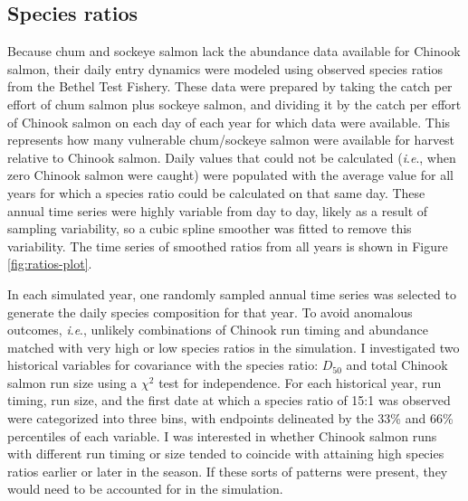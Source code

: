 \documentclass[12pt,]{book}
\theoremstyle{definition}
\theoremstyle{definition}
\theoremstyle{definition}
\theoremstyle{remark}
\begin{document}
\subsection{Species ratios}\label{mse-data-ratios}

\noindent
Because chum and sockeye salmon lack the abundance data available for
Chinook salmon, their daily entry dynamics were modeled using observed
species ratios from the Bethel Test Fishery. These data were prepared by
taking the catch per effort of chum salmon plus sockeye salmon, and
dividing it by the catch per effort of Chinook salmon on each day of
each year for which data were available. This represents how many
vulnerable chum/sockeye salmon were available for harvest relative to
Chinook salmon. Daily values that could not be calculated
(\emph{i}.\emph{e}., when zero Chinook salmon were caught) were
populated with the average value for all years for which a species ratio
could be calculated on that same day. These annual time series were
highly variable from day to day, likely as a result of sampling
variability, so a cubic spline smoother was fitted to remove this
variability. The time series of smoothed ratios from all years is shown
in Figure \ref{fig:ratios-plot}.

In each simulated year, one randomly sampled annual time series was
selected to generate the daily species composition for that year. To
avoid anomalous outcomes, \emph{i}.\emph{e}., unlikely combinations of
Chinook run timing and abundance matched with very high or low species
ratios in the simulation. I investigated two historical variables for
covariance with the species ratio: \(D_{50}\) and total Chinook salmon
run size using a \(\chi^2\) test for independence. For each historical
year, run timing, run size, and the first date at which a species ratio
of 15:1 was observed were categorized into three bins, with endpoints
delineated by the 33\% and 66\% percentiles of each variable. I was
interested in whether Chinook salmon runs with different run timing or
size tended to coincide with attaining high species ratios earlier or
later in the season. If these sorts of patterns were present, they would
need to be accounted for in the simulation.
\end{document}
